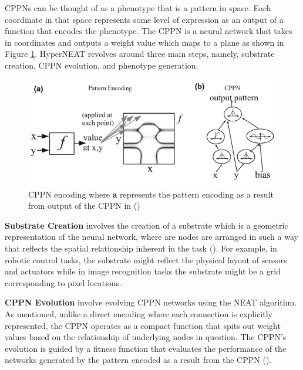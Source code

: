 \noindent CPPNs can be thought of as a phenotype that is a pattern in space. Each coordinate in that space represents some level of expression as an output of a function that encodes the phenotype. The CPPN is a neural network that takes in coordinates and outputs a weight value which maps to a plane as shown in Figure \ref{fig:ne_hyperneat_cppn}. HyperNEAT revolves around three main steps, namely, substrate creation, CPPN evolution, and phenotype generation. \bigskip

\begin{figure}[H] %
	\centering %
	\includegraphics[width=\textwidth]{Figures/chapter_ne/ne_hyperneat_cppn.png} %
	\caption{CPPN encoding where \textbf{a} represents the pattern encoding as a result from output of the CPPN in  (\cite{d2014hyperneat})}
	\label{fig:ne_hyperneat_cppn} %
\end{figure}

\noindent \textbf{Substrate Creation} involves the creation of a substrate which is a geometric representation of the neural network, where are nodes are arranged in such a way that reflects the spatial relationship inherent in the task (\cite{stanley2009hypercube}). For example, in robotic control tasks, the substrate might reflect the physical layout of sensors and actuators while in image recognition tasks the substrate might be a grid corresponding to pixel locations. \bigskip

\noindent \textbf{CPPN Evolution} involve evolving CPPN networks using the NEAT algorithm. As mentioned, unlike a direct encoding where each connection is explicitly represented, the CPPN operates as a compact function that spits out weight values based on the relationship of underlying nodes in question. The CPPN's evolution is guided by a fitness function that evaluates the performance of the networks generated by the pattern encoded as a result from the CPPN (\cite{stanley2009hypercube}). \bigskip

